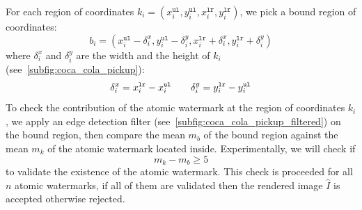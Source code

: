 \documentclass[a4paper,11pt,onecolumn]{memoir}
\begin{document}
For each region of coordinates $k_i = \left(x^{\mathtt{ul}}_i, y^{\mathtt{ul}}_{i},x^{\mathtt{lr}}_i, y^{\mathtt{lr}}_{i}\right)$, we pick a bound region of coordinates:
\begin{equation*}
    b_i =  \left(x^{\mathtt{ul}}_i - \delta^{x}_{i}, y^{\mathtt{ul}}_{i} - \delta^{y}_i ,x^{\mathtt{lr}}_i + \delta^{x}_{i}, y^{\mathtt{lr}}_{i} + \delta^{y}_{i}\right)
\end{equation*}
where $\delta^{x}_{i}$ and $\delta^{y}_{i}$ are the width and the height of $k_i$ (see~\autoref{subfig:coca_cola_pickup}):
\begin{equation*}
    \delta^{x}_{i} = x^{\mathtt{lr}}_i - x^{\mathtt{ul}}_i \qquad \delta^{y}_{i} = y^{\mathtt{lr}}_i - y^{\mathtt{ul}}_i \\
\end{equation*}
To check the contribution of the atomic watermark at the region of coordinates $k_i$, we apply an edge detection filter (see~\autoref{subfig:coca_cola_pickup_filtered}) on the bound region, then compare the mean $m_b$ of the bound region against the mean $m_k$ of the atomic watermark located inside. Experimentally, we will check if
\begin{equation}\label{eq:edge_difference}
    m_k - m_b \geq 5
\end{equation}
to validate the existence of the atomic watermark. This check is proceeded for all $n$ atomic watermarks, if all of them are validated then the rendered image $\hat{I}$ is accepted otherwise rejected.
\end{document}
